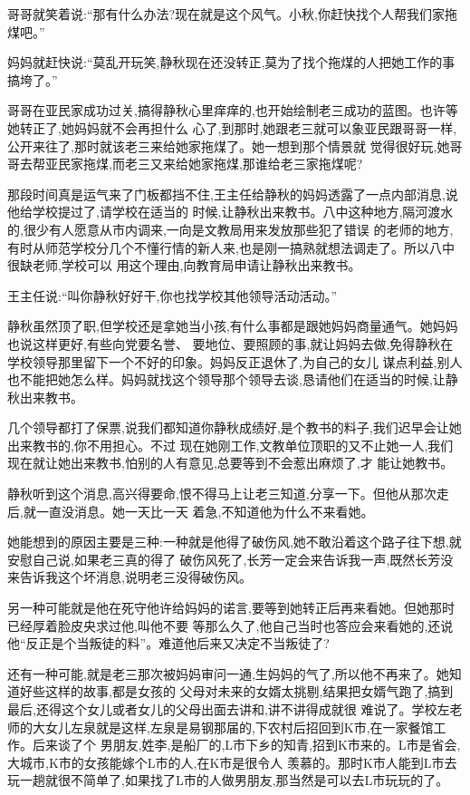 ﻿\documentclass[12pt]{article}
\begin{document}
哥哥就笑着说:``那有什么办法?现在就是这个风气。小秋,你赶快找个人帮我们家拖煤吧。''

妈妈就赶快说:``莫乱开玩笑,静秋现在还没转正,莫为了找个拖煤的人把她工作的事搞垮了。''

哥哥在亚民家成功过关,搞得静秋心里痒痒的,也开始绘制老三成功的蓝图。也许等她转正了,她妈妈就不会再担什么
心了,到那时,她跟老三就可以象亚民跟哥哥一样,公开来往了,那时就该老三来给她家拖煤了。她一想到那个情景就
觉得很好玩,她哥哥去帮亚民家拖煤,而老三又来给她家拖煤,那谁给老三家拖煤呢?

那段时间真是运气来了门板都挡不住,王主任给静秋的妈妈透露了一点内部消息,说他给学校提过了,请学校在适当的
时候,让静秋出来教书。八中这种地方,隔河渡水的,很少有人愿意从市内调来,一向是文教局用来发放那些犯了错误
的老师的地方,有时从师范学校分几个不懂行情的新人来,也是刚一搞熟就想法调走了。所以八中很缺老师,学校可以
用这个理由,向教育局申请让静秋出来教书。

王主任说:``叫你静秋好好干,你也找学校其他领导活动活动。''

静秋虽然顶了职,但学校还是拿她当小孩,有什么事都是跟她妈妈商量通气。她妈妈也说这样更好,有些向党要名誉、
要地位、要照顾的事,就让妈妈去做,免得静秋在学校领导那里留下一个不好的印象。妈妈反正退休了,为自己的女儿
谋点利益,别人也不能把她怎么样。妈妈就找这个领导那个领导去谈,恳请他们在适当的时候,让静秋出来教书。

几个领导都打了保票,说我们都知道你静秋成绩好,是个教书的料子,我们迟早会让她出来教书的,你不用担心。不过
现在她刚工作,文教单位顶职的又不止她一人,我们现在就让她出来教书,怕别的人有意见,总要等到不会惹出麻烦了,才
能让她教书。

静秋听到这个消息,高兴得要命,恨不得马上让老三知道,分享一下。但他从那次走后,就一直没消息。她一天比一天
着急,不知道他为什么不来看她。

她能想到的原因主要是三种:一种就是他得了破伤风,她不敢沿着这个路子往下想,就安慰自己说,如果老三真的得了
破伤风死了,长芳一定会来告诉我一声,既然长芳没来告诉我这个坏消息,说明老三没得破伤风。

另一种可能就是他在死守他许给妈妈的诺言,要等到她转正后再来看她。但她那时已经厚着脸皮央求过他,叫他不要
等那么久了,他自己当时也答应会来看她的,还说他``反正是个当叛徒的料''。难道他后来又决定不当叛徒了?

还有一种可能,就是老三那次被妈妈审问一通,生妈妈的气了,所以他不再来了。她知道好些这样的故事,都是女孩的
父母对未来的女婿太挑剔,结果把女婿气跑了,搞到最后,还得这个女儿或者女儿的父母出面去讲和,讲不讲得成就很
难说了。学校左老师的大女儿左泉就是这样,左泉是易钢那届的,下农村后招回到K市,在一家餐馆工作。后来谈了个
男朋友,姓李,是船厂的,L市下乡的知青,招到K市来的。L市是省会,大城市,K市的女孩能嫁个L市的人,在K市是很令人
羡慕的。那时K市人能到L市去玩一趟就很不简单了,如果找了L市的人做男朋友,那当然是可以去L市玩玩的了。
\end{document}
